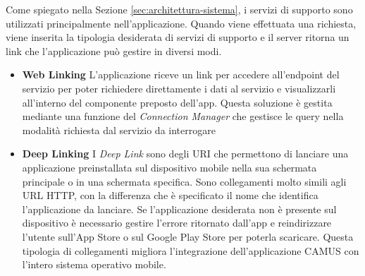Come spiegato nella Sezione \ref{sec:architettura-sistema}, i servizi di supporto sono utilizzati principalmente nell'applicazione. Quando viene effettuata una richiesta, viene inserita la tipologia desiderata di servizi di supporto e il server ritorna un link che l'applicazione può gestire in diversi modi.
\begin{itemize}
	\item \textbf{Web Linking} L'applicazione riceve un link per accedere all'endpoint del servizio per poter richiedere direttamente i dati al servizio e visualizzarli all'interno del componente preposto dell'app. Questa soluzione è gestita mediante una funzione del \emph{Connection Manager} che gestisce le query nella modalità richiesta dal servizio da interrogare
	\item \textbf{Deep Linking} I \emph{Deep Link} sono degli URI che permettono di lanciare una applicazione preinstallata sul dispositivo mobile nella sua schermata principale o in una schermata specifica. Sono collegamenti molto simili agli URL HTTP, con la differenza che è specificato il nome che identifica l'applicazione da lanciare. Se l'applicazione desiderata non è presente sul dispositivo è necessario gestire l'errore ritornato dall'app e reindirizzare l'utente sull'App Store o sul Google Play Store per poterla scaricare. Questa tipologia di collegamenti migliora l'integrazione dell'applicazione CAMUS con l'intero sistema operativo mobile. 
\end{itemize}
	 
